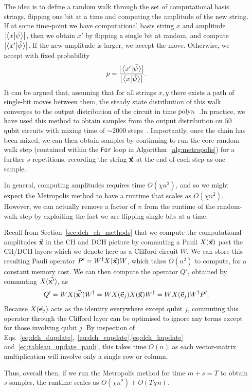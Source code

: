 The idea is to define a random walk through the set of computational basis strings, flipping one bit at a time and computing the amplitude of the new string. If at some time-point we have computational basis string $x$ and amplitude $\left|\braket{x}{\tilde{\psi}}\right|$, then we obtain $x'$ by flipping a single bit at random, and compute $\left|\braket{x'}{\tilde{\psi}}\right|$. If the new amplitude is larger, we accept the move. Otherwise, we accept with fixed probability
\[p = \frac{\left|\braket{x'}{\tilde{\psi}}\right|}{\left|\braket{x}{\tilde{\psi}}\right|}.\]
It can be argued that, assuming that for all strings $x, y$ there exists a path of single-bit moves between them, the steady state distribution of this walk converges to the output distribution of the circuit in time $\text{poly}{n}$~\cite{Bravyi2018}.In practice, we have used this method to obtain samples from the output distribution on $50$ qubit circuits with mixing time of $\sim 2000$ steps~\cite{Bravyi2018}. Importantly, once the chain has been mixed, we can then obtain samples by continuing to run the core random-walk step (contained within the \texttt{For} loop in Algorithm~\ref{alg:metropolis}) for a further $s$ repetitions, recording the string $\va{x}$ at the end of each step as one sample.\par
In general, computing amplitudes requires time $O\left(\chi n^{2}\right)$, and so we might expect the Metropolis method to have a runtime that scales as $O\left(\chi n^{2}\right)$. However, we can actually remove a factor of $n$ from the runtime of the random-walk step by exploiting the fact we are flipping single bits at a time.\par
Recall from Section~\ref{sec:dch_ch_methods} that we compute the computational amplitudes $\va{x}$ in the CH and DCH picture by commuting a Pauli $X(\va{x})$ past the CH/DCH layers which we denote here as a Clifford circuit $W$. We can store this resulting Pauli operator $P'=W^{\dagger}X(\va{x})W$, which takes $O(n^{2})$ to compute, for a constant memory cost. We can then compute the operator $Q'$, obtained by commuting $X(\va{x'})$, as
\[Q' = WX(\va{x'})W^{\dagger} = WX(\va{e}_{j})X(\va{x})W^{\dagger} = WX(\va{e}_{j})W^{\dagger} P'.\]
Because $X(\va{e}_{j})$ acts as the identity everywhere except qubit $j$, commuting this operator through the Clifford layer can be optimised to ignore any terms except for those involving qubit $j$. By inspection of Eqs.~\ref{eq:dch_dupdate},~\ref{eq:dch_cupdate},\ref{eq:dch_hupdate} and~\ref{eq:tableau_update_pauli}, this takes time $O(n)$ as each vector-matrix multiplication will involve only a single row or column.\par
Thus, overall then, if we run the Metropolis method for time $m+s=T$ to obtain $s$ samples, the runtime scales as $O\left(\chi n^{2}\right)+O\left(T\chi n\right)$.
